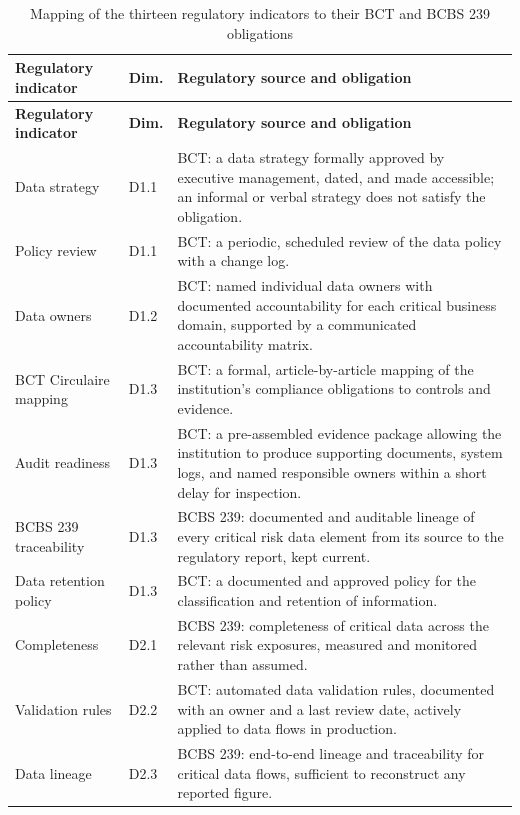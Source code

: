 \vspace{0.6em}
{\small
\setlength{\tabcolsep}{4pt}
\begin{longtable}{|p{3.4cm}|p{1.3cm}|p{9.6cm}|}
\caption{Mapping of the thirteen regulatory indicators to their BCT and BCBS 239 obligations}\label{tab:reg-mapping}\\

\hline
\textbf{Regulatory indicator} & \textbf{Dim.} & \textbf{Regulatory source and obligation} \\
\hline
\endfirsthead
\hline
\textbf{Regulatory indicator} & \textbf{Dim.} & \textbf{Regulatory source and obligation} \\
\hline
\endhead
\hline
\endfoot
\hline
\endlastfoot
Data strategy & D1.1 & BCT: a data strategy formally approved by executive management, dated, and made accessible; an informal or verbal strategy does not satisfy the obligation. \\
\hline
Policy review & D1.1 & BCT: a periodic, scheduled review of the data policy with a change log. \\
\hline
Data owners & D1.2 & BCT: named individual data owners with documented accountability for each critical business domain, supported by a communicated accountability matrix. \\
\hline
BCT Circulaire mapping & D1.3 & BCT: a formal, article-by-article mapping of the institution's compliance obligations to controls and evidence. \\
\hline
Audit readiness & D1.3 & BCT: a pre-assembled evidence package allowing the institution to produce supporting documents, system logs, and named responsible owners within a short delay for inspection. \\
\hline
BCBS 239 traceability & D1.3 & BCBS 239: documented and auditable lineage of every critical risk data element from its source to the regulatory report, kept current. \\
\hline
Data retention policy & D1.3 & BCT: a documented and approved policy for the classification and retention of information. \\
\hline
Completeness & D2.1 & BCBS 239: completeness of critical data across the relevant risk exposures, measured and monitored rather than assumed. \\
\hline
Validation rules & D2.2 & BCT: automated data validation rules, documented with an owner and a last review date, actively applied to data flows in production. \\
\hline
Data lineage & D2.3 & BCBS 239: end-to-end lineage and traceability for critical data flows, sufficient to reconstruct any reported figure. \\

\end{longtable}}
